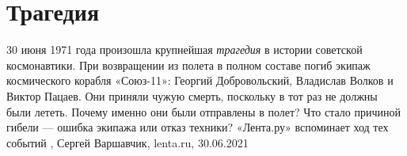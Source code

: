  
 
 
 
 
\chapter{Трагедия}

30 июня 1971 года произошла крупнейшая \emph{трагедия} в истории советской
космонавтики. При возвращении из полета в полном составе погиб экипаж
космического корабля «Союз-11»: Георгий Добровольский, Владислав Волков и
Виктор Пацаев. Они приняли чужую смерть, поскольку в тот раз не должны были
лететь. Почему именно они были отправлены в полет? Что стало причиной гибели —
ошибка экипажа или отказ техники? «Лента.ру» вспоминает ход тех событий
,
Сергей Варшавчик, lenta.ru, 30.06.2021
